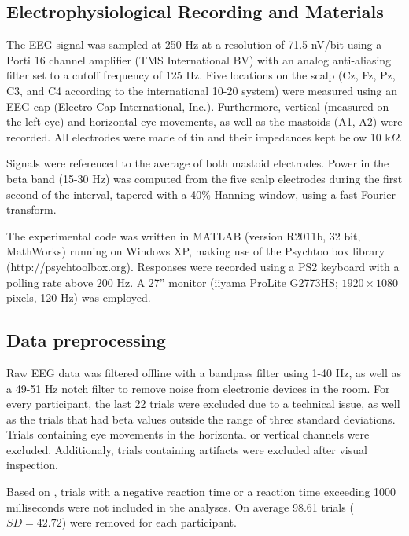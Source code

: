 \documentclass[man,floatsintext]{apa6} %
\begin{document}
\subsection{Electrophysiological Recording and Materials}
The EEG signal was sampled at 250 Hz at a resolution of 71.5 nV/bit using a Porti 16 channel amplifier (TMS International BV) with an analog anti-aliasing filter set to a cutoff frequency of 125 Hz. Five locations on the scalp (Cz, Fz, Pz, C3, and C4 according to the international 10-20 system) were measured using an EEG cap (Electro-Cap International, Inc.). Furthermore, vertical (measured on the left eye) and horizontal eye movements, as well as the mastoids (A1, A2) were recorded. All electrodes were made of tin and their impedances kept below 10 k$\Omega$.

Signals were referenced to the average of both mastoid electrodes. Power in the beta band (15-30 Hz) was computed from the five scalp electrodes during the first second of the interval, tapered with a 40\% Hanning window, using a fast Fourier transform.

The experimental code was written in MATLAB (version R2011b, 32 bit, MathWorks) running on Windows XP, making use of the Psychtoolbox library (http://psychtoolbox.org). Responses were recorded using a PS2 keyboard with a polling rate above 200 Hz. A 27'' monitor (iiyama ProLite G2773HS; $1920 \times 1080$ pixels, 120 Hz) was employed.

\subsection{Data preprocessing}
Raw EEG data was filtered offline with a bandpass filter using 1-40 Hz, as well as a 49-51 Hz notch filter to remove noise from electronic devices in the room.
For every participant, the last 22 trials were excluded due to a technical issue, as well as the trials that had beta values outside the range of three standard deviations. Trials containing eye movements in the horizontal or vertical channels were excluded. Additionaly, trials containing artifacts were excluded after visual inspection.

Based on ,  trials with a negative reaction time or a reaction time exceeding 1000 milliseconds were not included in the analyses. On average 98.61 trials ($SD = 42.72$) were removed for each participant.
\end{document}
